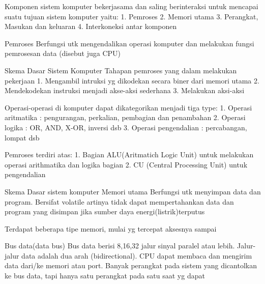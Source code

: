 Komponen sistem komputer bekerjasama dan saling berinteraksi untuk mencapai suatu tujuan sistem komputer yaitu:
1. Pemroses
2. Memori utama
3. Perangkat, Masukan dan keluaran
4. Interkoneksi antar komponen

Pemroses
Berfungsi utk mengendalikan operasi komputer dan melakukan fungsi pemrosesan data (disebut juga CPU)




Skema Dasar Sistem Komputer
Tahapan pemroses yang dalam melakukan pekerjaan
1. Mengambil intruksi yg dikodekan secara biner dari memori utama
2. Mendekodekan instruksi menjadi akse-aksi sederhana
3. Melakukan aksi-aksi

Operasi-operasi di komputer dapat dikategorikan menjadi tiga type:
1. Operasi aritmatika : pengurangan, perkalian, pembagian dan penambahan
2. Operasi logika : OR, AND, X-OR, inversi dsb
3. Operasi pengendalian : percabangan, lompat dsb

Pemroses terdiri atas:
1. Bagian ALU(Aritmatich Logic Unit) untuk melakukan operasi arithmatika dan logika bagian
2. CU (Central Processing Unit) untuk pengendalian 

Skema Dasar sistem komputer
Memori utama
Berfungsi utk menyimpan data dan program. Bersifat volatile artinya tidak dapat mempertahankan data dan program yang disimpan jika sumber daya energi(listrik)terputus

Terdapat beberapa tipe memori, mulai yg tercepat aksesnya sampai 

Bus data(data bus)
Bus data berisi 8,16,32 jalur sinyal paralel atau lebih. Jalur-jalur data adalah dua arah (bidirectional). CPU dapat membaca dan mengirim data dari/ke memori atau port. 
Banyak perangkat pada sistem yang dicantolkan ke bus data, tapi hanya satu perangkat pada satu saat yg dapat
